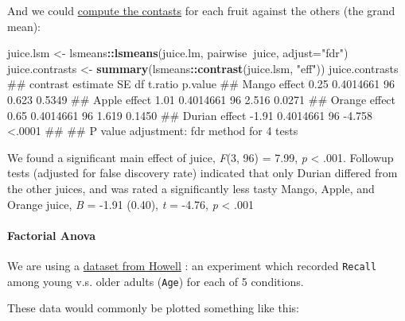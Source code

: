 \documentclass[]{article}
\newenvironment{Shaded}{\begin{snugshade}}{\end{snugshade}}
\newcommand{\KeywordTok}[1]{\textcolor[rgb]{0.13,0.29,0.53}{\textbf{#1}}}
\newcommand{\DataTypeTok}[1]{\textcolor[rgb]{0.13,0.29,0.53}{#1}}
\newcommand{\StringTok}[1]{\textcolor[rgb]{0.31,0.60,0.02}{#1}}
\newcommand{\OperatorTok}[1]{\textcolor[rgb]{0.81,0.36,0.00}{\textbf{#1}}}
\newcommand{\NormalTok}[1]{#1}
\let\oldparagraph\paragraph
\renewcommand{\paragraph}[1]{\oldparagraph{#1}\mbox{}}
\theoremstyle{definition}
\theoremstyle{definition}
\theoremstyle{definition}
\theoremstyle{remark}
\begin{document}
And we could \protect\hyperlink{contrasts}{compute the contasts} for
each fruit against the others (the grand mean):

\begin{Shaded}
\begin{Highlighting}[]
\NormalTok{juice.lsm <-}\StringTok{ }\NormalTok{lsmeans}\OperatorTok{::}\KeywordTok{lsmeans}\NormalTok{(juice.lm, pairwise}\OperatorTok{~}\NormalTok{juice, }\DataTypeTok{adjust=}\StringTok{"fdr"}\NormalTok{)}
\NormalTok{juice.contrasts <-}\StringTok{ }\KeywordTok{summary}\NormalTok{(lsmeans}\OperatorTok{::}\KeywordTok{contrast}\NormalTok{(juice.lsm, }\StringTok{"eff"}\NormalTok{))}
\NormalTok{juice.contrasts}
\NormalTok{##  contrast      estimate        SE df t.ratio p.value}
\NormalTok{##  Mango effect      0.25 0.4014661 96   0.623  0.5349}
\NormalTok{##  Apple effect      1.01 0.4014661 96   2.516  0.0271}
\NormalTok{##  Orange effect     0.65 0.4014661 96   1.619  0.1450}
\NormalTok{##  Durian effect    -1.91 0.4014661 96  -4.758  <.0001}
\NormalTok{## }
\NormalTok{## P value adjustment: fdr method for 4 tests}
\end{Highlighting}
\end{Shaded}

{We found a significant main effect of juice, \emph{F}(3, 96) = 7.99,
\emph{p} \textless{} .001. Followup tests (adjusted for false discovery
rate) indicated that only Durian differed from the other juices, and was
rated a significantly less tasty Mango, Apple, and Orange juice,
\emph{B} = -1.91 (0.40), \emph{t} = -4.76, \emph{p} \textless{} .001}

\hypertarget{howell-factorial-example}{\paragraph{Factorial
Anova}\label{howell-factorial-example}}

We are using a
\href{http://www.uvm.edu/~dhowell/methods7/DataFiles/Tab13-2.dat}{dataset
from Howell} \citep[chapter 13]{howell2012statistical}: an experiment
which recorded \texttt{Recall} among young v.s. older adults
(\texttt{Age}) for each of 5 conditions.

These data would commonly be plotted something like this:

\begin{Shaded}
\end{Shaded}
\end{document}

